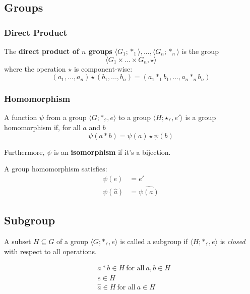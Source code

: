 \documentclass[11pt]{article}
\begin{document}
\subsection{Groups}

\subsubsection{Direct Product}

The \textbf{direct product of $n$ groups} $\langle G_1; *_1\rangle, ..., \langle G_n; *_n\rangle$ is the group
\begin{equation*}
	\langle G_1 \times ... \times G_n, \star\rangle
\end{equation*}
where the operation $\star$ is component-wise:
\begin{equation*}
	(a_1,..., a_n) \star (b_1,...,b_n) = (a_1 *_1 b_1,...,a_n *_n b_n)
\end{equation*}

\subsubsection{Homomorphism}

A function $\psi$ from a group $\langle G; *, \hat{}, e\rangle$ to a group $\langle H; \star, \hat{}, e'\rangle$ is a group homomorphism if, for all $a$ and $b$
\begin{equation*}
	\psi(a * b) = \psi(a) \star \psi(b)
\end{equation*}

Furthermore, $\psi$ is an \textbf{isomorphism} if it's a bijection.

A group homomorphism satisfies:
\begin{equation*}
\begin{split}
	\psi(e) & = e' \\
	\psi(\hat{a}) & = \widehat{\psi(a)}
\end{split}
\end{equation*}

\subsection{Subgroup}

A subset $H \subseteq G$ of a group $\langle G; *, \hat{}, e\rangle$ is called a subgroup if $\langle H; *, \hat{}, e\rangle$ is \emph{closed} with respect to all operations.

\begin{equation*}
\begin{split}
	& a * b \in H \ \text{for all}\ a,b \in H \\
	& e \in H \\
	& \hat{a} \in H  \ \text{for all}\ a \in H
\end{split}
\end{equation*}
\end{document}
